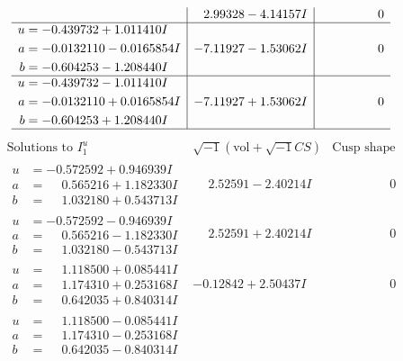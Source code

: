\documentclass[1p]{elsarticle_modified}
\theoremstyle{definition}
\newcommand{\I}{\sqrt{-1}}
\begin{document}
$$\begin{array}{c|c|c}
 & \phantom{-}2.99328 - 4.14157 I & \phantom{-0.000000 } 0 \\ \hline\begin{aligned}
u &= -0.439732 + 1.011410 I \\
a &= -0.0132110 - 0.0165854 I \\
b &= -0.604253 - 1.208440 I\end{aligned}
 & -7.11927 - 1.53062 I & \phantom{-0.000000 } 0 \\ \hline\begin{aligned}
u &= -0.439732 - 1.011410 I \\
a &= -0.0132110 + 0.0165854 I \\
b &= -0.604253 + 1.208440 I\end{aligned}
 & -7.11927 + 1.53062 I & \phantom{-0.000000 } 0\\
 \hline 
 \end{array}$$\newpage$$\begin{array}{c|c|c}  
\text{Solutions to }I^u_{1}& \I (\text{vol} + \sqrt{-1}CS) & \text{Cusp shape}\\
 \hline 
\begin{aligned}
u &= -0.572592 + 0.946939 I \\
a &= \phantom{-}0.565216 + 1.182330 I \\
b &= \phantom{-}1.032180 + 0.543713 I\end{aligned}
 & \phantom{-}2.52591 - 2.40214 I & \phantom{-0.000000 } 0 \\ \hline\begin{aligned}
u &= -0.572592 - 0.946939 I \\
a &= \phantom{-}0.565216 - 1.182330 I \\
b &= \phantom{-}1.032180 - 0.543713 I\end{aligned}
 & \phantom{-}2.52591 + 2.40214 I & \phantom{-0.000000 } 0 \\ \hline\begin{aligned}
u &= \phantom{-}1.118500 + 0.085441 I \\
a &= \phantom{-}1.174310 + 0.253168 I \\
b &= \phantom{-}0.642035 + 0.840314 I\end{aligned}
 & -0.12842 + 2.50437 I & \phantom{-0.000000 } 0 \\ \hline\begin{aligned}
u &= \phantom{-}1.118500 - 0.085441 I \\
a &= \phantom{-}1.174310 - 0.253168 I \\
b &= \phantom{-}0.642035 - 0.840314 I\end{aligned}

\end{array}$$
\end{document}
